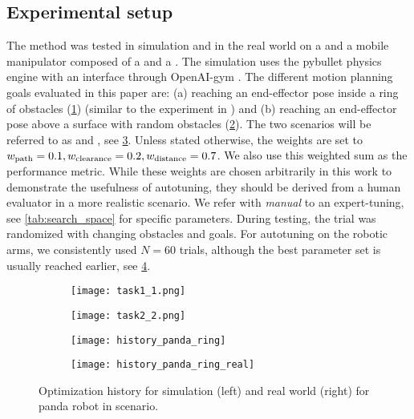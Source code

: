 \subsection{Experimental setup}
%
The method was tested in simulation and in the real world on a \panda{} and a
mobile manipulator composed of a \boxer{} and a \panda{}. The simulation uses
the pybullet physics engine with an interface through OpenAI-gym
\cite{spahn_urdf_environment}. 
The
different motion planning goals evaluated in this paper are: (a) reaching an
end-effector pose inside a ring of obstacles (\cref{fig:reachinginring})
(similar to the experiment in \cite{Wyk2022}) and (b) reaching an end-effector
pose above a surface with random obstacles (\cref{fig:reachingontable}). The
two scenarios will be referred to as \reachinginring{} and \reachingontable{},
see \cref{fig:tasks}. Unless stated otherwise, the weights are set to
$w_{\textrm{path}}=0.1, w_{\textrm{clearance}}=0.2, w_{\textrm{distance}}=0.7$. We also use this weighted
sum as the performance metric. 
While these weights are chosen arbitrarily in this work to demonstrate
the usefulness of autotuning, they should be derived from a human evaluator
in a more realistic scenario.
We refer with \textit{manual} to an expert-tuning, see \cref{tab:search_space}
for specific parameters. During testing, the trial was randomized with changing
obstacles and goals. For autotuning on the robotic arms, we consistently used
$N=60$ trials, although the best parameter set is usually reached earlier, see
\cref{fig:history}.
%
\begin{figure}
    \centering
    \begin{subfigure}[b]{0.35\linewidth}
        \centering
        \texttt{[image: task1\_1.png]}
        \caption{\reachinginring{}}
        \label{fig:reachinginring}
    \end{subfigure}
    \begin{subfigure}[b]{0.35\linewidth}
        \centering
        \texttt{[image: task2\_2.png]}
        \caption{\reachingontable{}}
        \label{fig:reachingontable}
    \end{subfigure}
    \label{fig:tasks}
\end{figure}
%
\begin{figure}
    \centering
    \begin{subfigure}[b]{0.49\linewidth}
        \texttt{[image: history\_panda\_ring]}
    \end{subfigure}
    \begin{subfigure}[b]{0.49\linewidth}
        \texttt{[image: history\_panda\_ring\_real]}
    \end{subfigure}
    \captionsetup{belowskip=-20pt}
    \caption{Optimization history for simulation (left) and real world (right) for panda robot in 
        \reachinginring{} scenario.}
    \label{fig:history}
\end{figure}

